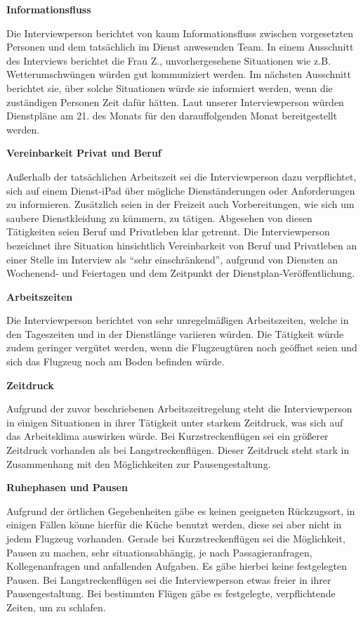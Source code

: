\documentclass[12pt, a4paper]{article}
\begin{document}
\textbf{Informationsfluss}

Die Interviewperson berichtet von kaum Informationsfluss zwischen vorgesetzten Personen und dem tatsächlich im Dienst anwesenden Team. 
In einem Ausschnitt des Interviews berichtet die Frau Z., unvorhergesehene Situationen wie z.B. Wetterumschwüngen würden gut kommuniziert werden.
Im nächsten Ausschnitt berichtet sie, über solche Situationen würde sie informiert werden, wenn die zuständigen Personen Zeit dafür hätten.
Laut unserer Interviewperson würden Dienstpläne am 21. des Monats für den darauffolgenden Monat bereitgestellt werden.

\textbf{Vereinbarkeit Privat und Beruf}

Außerhalb der tatsächlichen Arbeitszeit sei die Interviewperson dazu verpflichtet, sich auf einem Dienst-iPad über mögliche Dienständerungen
oder Anforderungen zu informieren. Zusätzlich seien in der Freizeit auch Vorbereitungen, wie sich um saubere Dienstkleidung zu kümmern, zu tätigen.
Abgesehen von diesen Tätigkeiten seien Beruf und Privatleben klar getrennt.
Die Interviewperson bezeichnet ihre Situation hinsichtlich Vereinbarkeit von Beruf 
und Privatleben an einer Stelle im Interview als “sehr einschränkend”, aufgrund von Diensten an Wochenend- und Feiertagen 
und dem Zeitpunkt der Dienstplan-Veröffentlichung.

\textbf{Arbeitszeiten}

Die Interviewperson berichtet von sehr unregelmäßigen Arbeitszeiten, welche in den Tageszeiten und in der Dienstlänge variieren würden.
Die Tätigkeit würde zudem geringer vergütet werden, wenn die Flugzeugtüren noch geöffnet seien und sich das Flugzeug noch am Boden befinden würde. 

\textbf{Zeitdruck}

Aufgrund der zuvor beschriebenen Arbeitszeitregelung steht die Interviewperson in einigen Situationen in ihrer Tätigkeit unter starkem Zeitdruck,
was sich auf das Arbeitsklima auswirken würde. 
Bei Kurzstreckenflügen sei ein größerer Zeitdruck vorhanden als bei Langstreckenflügen.
Dieser Zeitdruck steht stark in Zusammenhang mit den Möglichkeiten zur Pausengestaltung.

\textbf{Ruhephasen und Pausen}

Aufgrund der örtlichen Gegebenheiten gäbe es keinen geeigneten Rückzugsort, in einigen Fällen könne hierfür die Küche benutzt werden,
diese sei aber nicht in jedem Flugzeug vorhanden.
Gerade bei Kurzstreckenflügen sei die Möglichkeit, Pausen zu machen, sehr situationsabhängig, 
je nach Passagieranfragen, Kollegenanfragen und anfallenden Aufgaben. 
Es gäbe hierbei keine festgelegten Pausen. Bei Langstreckenflügen sei die Interviewperson etwas freier in ihrer Pausengestaltung.
Bei bestimmten Flügen gäbe es festgelegte, verpflichtende Zeiten, um zu schlafen. 
\end{document}
